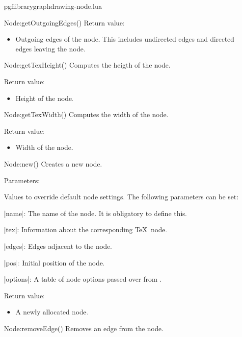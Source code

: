 \begin{filedescription}{pgflibrarygraphdrawing-node.lua}
\begin{luacommand}{{Node:getOutgoingEdges}()}
Return value:
\begin{itemize} \item[] Outgoing edges of the node. This includes undirected edges and directed edges leaving the node.  \end{itemize}


\end{luacommand}\begin{luacommand}{{Node:getTexHeight}()}
Computes the heigth of the node. 


Return value:
\begin{itemize} \item[] Height of the node.  \end{itemize}


\end{luacommand}\begin{luacommand}{{Node:getTexWidth}()}
Computes the width of the node. 


Return value:
\begin{itemize} \item[] Width of the node.  \end{itemize}


\end{luacommand}\begin{luacommand}{{Node:new}()}
Creates a new node. 

Parameters:
\begin{parameterdescription}
	\item[\meta{values}] Values to override default node settings. The following parameters can be set:\par |name|: The name of the node. It is obligatory to define this.\par |tex|:  Information about the corresponding \TeX\ node.\par |edges|: Edges adjacent to the node.\par |pos|: Initial position of the node.\par |options|: A table of node options passed over from \tikzname. 
\end{parameterdescription}


Return value:
\begin{itemize} \item[] A newly allocated node.  \end{itemize}


\end{luacommand}\begin{luacommand}{{Node:removeEdge}()}
Removes an edge from the node. 


\end{luacommand}
\end{filedescription}
